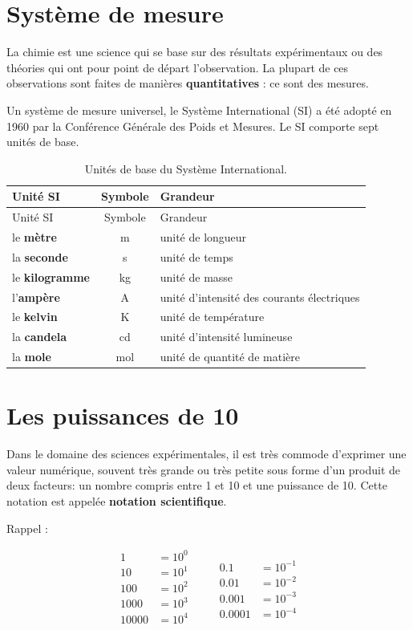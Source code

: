 \documentclass[
  11pt,
  french,
  a4paper,
  openany]{book}
\begin{document}
\hypertarget{systuxe8me-de-mesure}{%
\section{Système de mesure}\label{systuxe8me-de-mesure}}

La chimie est une science qui se base sur des résultats expérimentaux ou des théories qui ont pour point de départ l'observation. La plupart de ces observations sont faites de manières \textbf{quantitatives} : ce sont des mesures.

Un système de mesure universel, le Système International (SI) a été adopté en 1960 par la Conférence Générale des Poids et Mesures. Le SI comporte sept unités de base.

\begin{longtable}[]{@{}lcl@{}}
\caption{\label{tab:tab-SIunits} Unités de base du Système International.}\tabularnewline
\toprule
Unité SI & Symbole & Grandeur\tabularnewline
\midrule
\endfirsthead
\toprule
Unité SI & Symbole & Grandeur\tabularnewline
\midrule
\endhead
le \textbf{mètre} & m & unité de longueur\tabularnewline
la \textbf{seconde} & s & unité de temps\tabularnewline
le \textbf{kilogramme} & kg & unité de masse\tabularnewline
l'\textbf{ampère} & A & unité d'intensité des courants électriques\tabularnewline
le \textbf{kelvin} & K & unité de température\tabularnewline
la \textbf{candela} & cd & unité d'intensité lumineuse\tabularnewline
la \textbf{mole} & mol & unité de quantité de matière\tabularnewline
\bottomrule
\end{longtable}

\hypertarget{les-puissances-de-10}{%
\section{Les puissances de 10}\label{les-puissances-de-10}}

Dans le domaine des sciences expérimentales, il est très commode d'exprimer une valeur numérique, souvent très grande ou très petite sous forme d'un produit de deux facteurs: un nombre compris entre 1 et 10 et une puissance de 10. Cette notation est appelée \textbf{notation scientifique}.

Rappel :

\[ \begin{split}
    1 &= 10^0\\
    10 &= 10^1\\
    100 &= 10^2\\
    1000 &= 10^3\\
    10000 &= 10^4
\end{split}
\qquad
\begin{split}
    \\
    0.1 &= 10^{-1}\\
    0.01 &= 10^{-2}\\
    0.001 &= 10^{-3}\\
    0.0001 &= 10^{-4}
\end{split} \]
\end{document}
